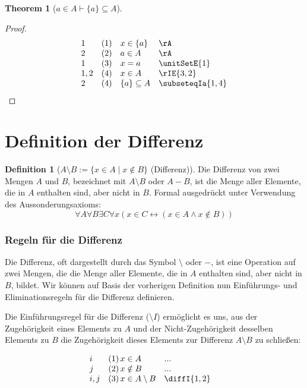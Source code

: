 \documentclass{book}
\theoremstyle{plain}
\newtheorem{theorem}{Theorem}
\theoremstyle{remark}
\theoremstyle{definition}
\newtheorem{definition}{Definition}[section]
\begin{document}
\label{aInAImpLbaRbSubseteqA}
\begin{theorem}[\(a\in A\vdash \{a\}\subseteq A\)]
\end{theorem}
\begin{proof}
	\[
	\begin{array}{llll}
		1 & (1) & x\in \{a\} & \rA \\
		2 & (2) & a\in A & \rA \\
		1 & (3) & x=a & \unitSetE{1} \\		
		1,2 & (4) & x\in A & \rIE{3,2} \\	
		2 & (4) & \{a\}\subseteq A & \subseteqIa{1,4} \\	
	\end{array}
	\]
\end{proof}

\section{Definition der Differenz}

\begin{definition}[\(A \setminus B := \{ x \in A \mid x \notin B \}\) (Differenz)]
	Die Differenz von zwei Mengen \(A\) und \(B\), bezeichnet mit \(A \setminus B\) oder \(A - B\), ist die Menge aller Elemente, die in \(A\) enthalten sind, aber nicht in \(B\). 
	Formal ausgedrückt unter Verwendung des Aussonderungsaxioms:
	\[
	\forall A \forall B \exists C \forall x (x \in C \leftrightarrow (x \in A \land x \notin B))
	\]
\end{definition}

\subsubsection{Regeln für die Differenz}
\label{rule:diffI} \label{rule:diffEa} \label{rule:diffEb}

Die Differenz, oft dargestellt durch das Symbol \(\setminus\) oder \(-\), ist eine Operation auf zwei Mengen, die die Menge aller Elemente, die in \(A\) enthalten sind, aber nicht in \(B\), bildet. Wir können auf Basis der vorherigen Definition nun Einführungs- und Eliminationsregeln für die Differenz definieren.

Die Einführungsregel für die Differenz (\( \setminus I \)) ermöglicht es uns, aus der Zugehörigkeit eines Elements zu \(A\) und der Nicht-Zugehörigkeit desselben Elements zu \(B\) die Zugehörigkeit dieses Elements zur Differenz \(A \setminus B\) zu schließen:

\[
\begin{array}{llll}
	i & (1) \, x \in A & ... & \\
	j & (2) \, x \notin B & ... & \\
	i,j & (3) \, x \in A \setminus B & \diffI{1,2} \\
\end{array}
\]
\end{document}
